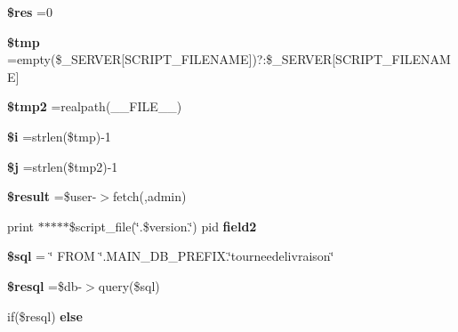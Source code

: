 \begin{DoxyCompactItemize}
\item 
\mbox{\label{scripts_2tourneedelivraison_8php_a49a8a4009b02e49717caa88b128affc5}} 
{\bfseries \$res} =0
\item 
\mbox{\label{scripts_2tourneedelivraison_8php_a57024d47cf8348153f5fdda16f8fefa9}} 
{\bfseries \$tmp} =empty(\$\+\_\+\+S\+E\+R\+V\+ER\mbox{[}\textquotesingle{}S\+C\+R\+I\+P\+T\+\_\+\+F\+I\+L\+E\+N\+A\+ME\textquotesingle{}\mbox{]})?\textquotesingle{}\textquotesingle{}\+:\$\+\_\+\+S\+E\+R\+V\+ER\mbox{[}\textquotesingle{}S\+C\+R\+I\+P\+T\+\_\+\+F\+I\+L\+E\+N\+A\+ME\textquotesingle{}\mbox{]}
\item 
\mbox{\label{scripts_2tourneedelivraison_8php_aed9bcb6730d1510376ce80e32bd9504d}} 
{\bfseries \$tmp2} =realpath(\+\_\+\+\_\+\+F\+I\+L\+E\+\_\+\+\_\+)
\item 
\mbox{\label{scripts_2tourneedelivraison_8php_a83018d9153d17d91fbcf3bc10158d34f}} 
{\bfseries \$i} =strlen(\$tmp)-\/1
\item 
\mbox{\label{scripts_2tourneedelivraison_8php_a6f16db779ef3ccea921b277b5dc245d1}} 
{\bfseries \$j} =strlen(\$tmp2)-\/1
\item 
\mbox{\label{scripts_2tourneedelivraison_8php_a112ef069ddc0454086e3d1e6d8d55d07}} 
{\bfseries \$result} =\$user-\/$>$fetch(\textquotesingle{}\textquotesingle{},\textquotesingle{}admin\textquotesingle{})
\item 
\mbox{\label{scripts_2tourneedelivraison_8php_af9edfce80596a171cfb2884ba7ad01df}} 
print $\ast$$\ast$$\ast$$\ast$$\ast$\$script\+\_\+file(\char`\"{}.\$version.\char`\"{}) pid {\bfseries field2}
\item 
\mbox{\label{scripts_2tourneedelivraison_8php_a047170d6020a882807665812a27e2525}} 
{\bfseries \$sql} = \char`\"{} F\+R\+OM \char`\"{}.M\+A\+I\+N\+\_\+\+D\+B\+\_\+\+P\+R\+E\+F\+I\+X.\char`\"{}tourneedelivraison\char`\"{}
\item 
\mbox{\label{scripts_2tourneedelivraison_8php_a6adc5ef389ab51c21dee69262018d615}} 
{\bfseries \$resql} =\$db-\/$>$query(\$sql)
\item 
if(\$resql) {\bfseries else}
\end{DoxyCompactItemize}


